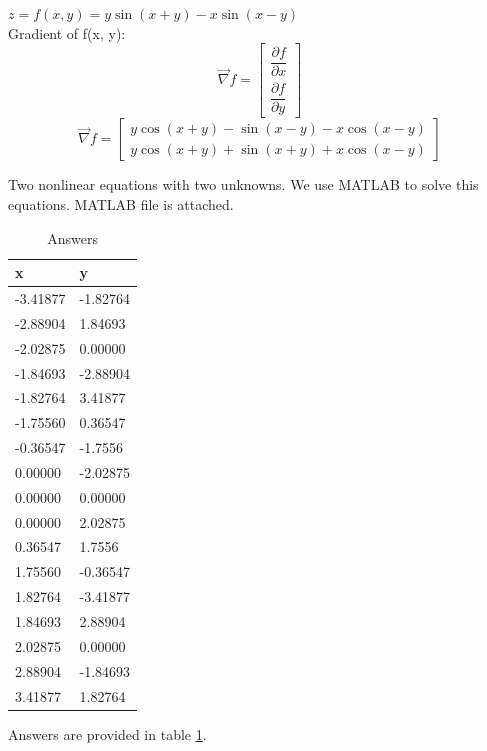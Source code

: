 $z = f(x, y) = y\sin(x+y)-x\sin(x-y)$ \\
Gradient of f(x, y):
$$\vec{\nabla} f = \begin{bmatrix}
	\dfrac{\partial f}{\partial x} \\[6pt]
	\dfrac{\partial f}{\partial y}
\end{bmatrix} $$
$$\vec{\nabla} f = \begin{bmatrix}
	y \cos(x + y) - \sin(x - y) - x  \cos(x - y) \\
	y  \cos(x + y) + \sin(x + y) + x  \cos(x - y)
\end{bmatrix} $$

Two nonlinear equations with two unknowns. We use MATLAB to solve this equations. MATLAB file is attached.
\begin{table}[h]
				\caption {Answers} \label{ans} 
	\begin{center}
		\begin{tabular}{| l | l |}
			\hline
			x & y\TBstrut \\
			\hline
			-3.41877 & -1.82764 \Tstrut\\
			-2.88904 & 1.84693 \Tstrut\\
			-2.02875 & 0.00000 \Tstrut\\
			-1.84693 & -2.88904 \Tstrut\\
			-1.82764 & 3.41877 \Tstrut\\
			-1.75560 & 0.36547 \Tstrut\\
			-0.36547 & -1.7556 \Tstrut\\
			0.00000 & -2.02875 \Tstrut\\
			0.00000 & 0.00000 \Tstrut\\
			0.00000 & 2.02875 \Tstrut\\
			0.36547 & 1.7556 \Tstrut\\
			1.75560 & -0.36547 \Tstrut\\
			1.82764 & -3.41877 \Tstrut\\
			1.84693 & 2.88904 \Tstrut\\
			2.02875 & 0.00000 \Tstrut\\
			2.88904 & -1.84693 \Tstrut\\
			3.41877 & 1.82764 \Tstrut\\
			\hline
		\end{tabular}
	\end{center}
\end{table}
Answers are provided in table \ref{ans}.



